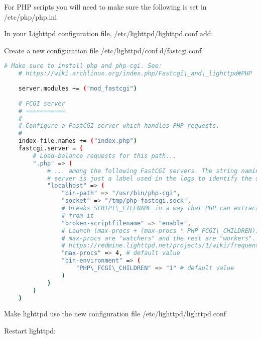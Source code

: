 For PHP scripts you will need to make sure the following is set in /etc/php/php.ini 


In your Lighttpd configuration file, /etc/lighttpd/lighttpd.conf add: 


Create a new configuration file /etc/lighttpd/conf.d/fastcgi.conf 

\begin{lstlisting}[language=bash,morekeywords=$,keywordstyle=\bfseries,frame=none,xleftmargin=.25in,belowskip=2em, aboveskip=2em]
    # Make sure to install php and php-cgi. See:                                                             
    # https://wiki.archlinux.org/index.php/Fastcgi\_and\_lighttpd#PHP
     
    server.modules += ("mod_fastcgi")
     
    # FCGI server
    # ===========
    #
    # Configure a FastCGI server which handles PHP requests.
    #
    index-file.names += ("index.php")
    fastcgi.server = ( 
        # Load-balance requests for this path...
        ".php" => (
            # ... among the following FastCGI servers. The string naming each
            # server is just a label used in the logs to identify the server.
            "localhost" => ( 
                "bin-path" => "/usr/bin/php-cgi",
                "socket" => "/tmp/php-fastcgi.sock",
                # breaks SCRIPT\_FILENAME in a way that PHP can extract PATH\_INFO
                # from it 
                "broken-scriptfilename" => "enable",
                # Launch (max-procs + (max-procs * PHP_FCGI\_CHILDREN)) procs, where
                # max-procs are "watchers" and the rest are "workers". See:
                # https://redmine.lighttpd.net/projects/1/wiki/frequentlyaskedquestions#How-many-php-CGI-processes-will-lighttpd-spawn 
                "max-procs" => 4, # default value
                "bin-environment" => (
                    "PHP\_FCGI\_CHILDREN" => "1" # default value
                )
            )
        )   
    )
\end{lstlisting} 

Make lighttpd use the new configuration file /etc/lighttpd/lighttpd.conf 


Restart lighttpd: 


